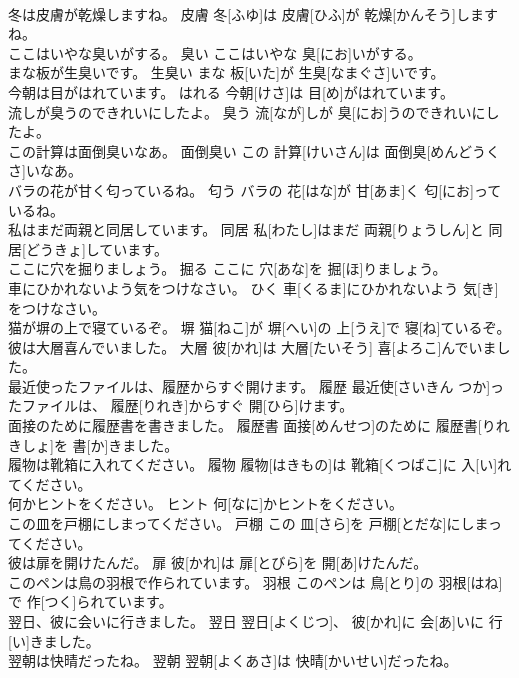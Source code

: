 \documentclass[8pt]{extreport}
\begin{document}
\begin{CJK}{UTF8}{min}
\\	冬は皮膚が乾燥しますね。	皮膚	冬[ふゆ]は 皮膚[ひふ]が 乾燥[かんそう]しますね。	
\\	ここはいやな臭いがする。	臭い	ここはいやな 臭[にお]いがする。	
\\	まな板が生臭いです。	生臭い	まな 板[いた]が 生臭[なまぐさ]いです。	
\\	今朝は目がはれています。	はれる	今朝[けさ]は 目[め]がはれています。	
\\	流しが臭うのできれいにしたよ。	臭う	流[なが]しが 臭[にお]うのできれいにしたよ。	
\\	この計算は面倒臭いなあ。	面倒臭い	この 計算[けいさん]は 面倒臭[めんどうくさ]いなあ。	
\\	バラの花が甘く匂っているね。	匂う	バラの 花[はな]が 甘[あま]く 匂[にお]っているね。	
\\	私はまだ両親と同居しています。	同居	私[わたし]はまだ 両親[りょうしん]と 同居[どうきょ]しています。	
\\	ここに穴を掘りましょう。	掘る	ここに 穴[あな]を 掘[ほ]りましょう。	
\\	車にひかれないよう気をつけなさい。	ひく	車[くるま]にひかれないよう 気[き]をつけなさい。	
\\	猫が塀の上で寝ているぞ。	塀	猫[ねこ]が 塀[へい]の 上[うえ]で 寝[ね]ているぞ。	
\\	彼は大層喜んでいました。	大層	彼[かれ]は 大層[たいそう] 喜[よろこ]んでいました。	
\\	最近使ったファイルは、履歴からすぐ開けます。	履歴	最近使[さいきん つか]ったファイルは、 履歴[りれき]からすぐ 開[ひら]けます。	
\\	面接のために履歴書を書きました。	履歴書	面接[めんせつ]のために 履歴書[りれきしょ]を 書[か]きました。	
\\	履物は靴箱に入れてください。	履物	履物[はきもの]は 靴箱[くつばこ]に 入[い]れてください。	
\\	何かヒントをください。	ヒント	何[なに]かヒントをください。	
\\	この皿を戸棚にしまってください。	戸棚	この 皿[さら]を 戸棚[とだな]にしまってください。	
\\	彼は扉を開けたんだ。	扉	彼[かれ]は 扉[とびら]を 開[あ]けたんだ。	
\\	このペンは鳥の羽根で作られています。	羽根	このペンは 鳥[とり]の 羽根[はね]で 作[つく]られています。	
\\	翌日、彼に会いに行きました。	翌日	翌日[よくじつ]、 彼[かれ]に 会[あ]いに 行[い]きました。	
\\	翌朝は快晴だったね。	翌朝	翌朝[よくあさ]は 快晴[かいせい]だったね。	

\end{CJK}
\end{document}
